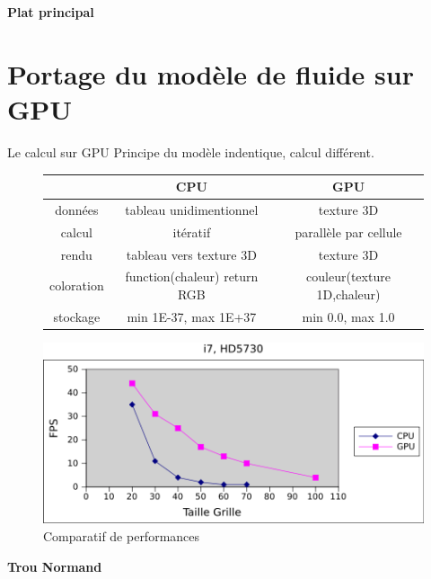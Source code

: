 \documentclass{beamer}
\begin{document}
\begin{frame}
  \begin{center}
    \textbf{Plat principal}
  \end{center}
\end{frame}


\section{Portage du modèle de fluide sur GPU}
\begin{frame}{Le calcul sur GPU}
  Principe du modèle indentique, calcul différent.\\
  \begin{figure}[!h]
    \begin{tabular}{c|c|c}
       & CPU & GPU \\
      \hline
      données & tableau unidimentionnel  & texture 3D \\
      calcul  & itératif                 & parallèle par cellule \\
      rendu   & tableau vers texture 3D    & texture 3D \\
      coloration & function(chaleur) return RGB & couleur(texture 1D,chaleur) \\
      stockage & min 1E-37, max 1E+37 & min 0.0, max 1.0 \\
    \end{tabular}
  \end{figure}
\end{frame}


\begin{frame}{}
  \begin{figure}[!h]
    \centering\includegraphics[scale=0.5]{Grille1.png}
    \caption{Comparatif de performances}
    \label{AvecPerlin33}
  \end{figure}
\end{frame}


\begin{frame}
  \begin{center}
    \textbf{Trou Normand}
  \end{center}
\end{frame}
\end{document}
